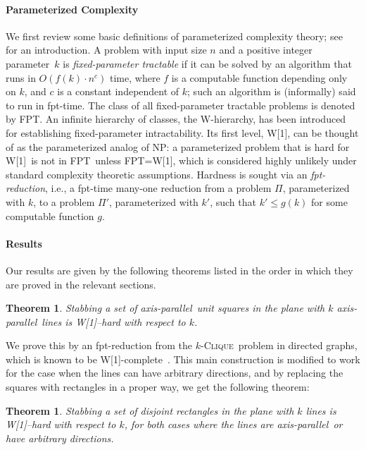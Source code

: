 \documentclass[12pt]{article}
\newtheorem{theorem}[definition]{Theorem}
\newcommand{\cclass}[1]{{#1}}
\newcommand{\problem}[1]{\textsc{#1}}
\newcommand{\fpt}{\cclass{FPT}}
\newcommand{\wone}{\cclass{W[1]}}
\newcommand{\clique}{\problem{Clique}}
\newcommand{\ap}{a.p.\ }
\renewcommand{\ap}{axis-parallel\ }
\begin{document}
\paragraph{Parameterized Complexity}
We first review some basic definitions of parameterized complexity theory;
see~\cite{DF99,FG06} for an introduction.
A problem with input size $n$ and a positive integer parameter~$k$ is
\emph{fixed-parameter tractable} if it can be solved by an algorithm that
runs in $O(f(k)\cdot n^{c})$ time, where $f$ is a computable function
depending only on $k$, and $c$ is a constant independent of $k$; such an
algorithm is (informally) said to run in fpt-time.  The class of all
fixed-parameter tractable problems is denoted by \fpt. An infinite
hierarchy of classes, the W-hierarchy, has been introduced for establishing
fixed-parameter intractability.  Its first level, \wone, can be thought of
as the parameterized analog of NP: a parameterized problem that is hard for
\wone\ is not in \fpt\ unless \fpt=\wone, which is considered highly
unlikely under standard complexity theoretic assumptions.  Hardness is
sought via an \emph{fpt-reduction}, i.e., a fpt-time many-one reduction
from a problem $\Pi$, parameterized with $k$, to a problem $\Pi'$,
parameterized with $k'$, such that $k'\leq g(k)$ for some computable
function $g$.

\paragraph{Results}

Our results are given by the following theorems listed in the order in which they are proved in the relevant sections.

\begin{theorem}\label{thm:wonehardunitsquaresap} 
Stabbing a set of \ap unit squares in the plane with $k$ \ap lines is \wone--hard with respect to $k$.
\end{theorem}

We prove this by an fpt-reduction from the $k$-\clique\ problem in directed
graphs, which is known to be W[1]-complete~\cite{FG06}. 
This main construction is modified to work for the case when the lines can have arbitrary directions, and 
by replacing the squares with rectangles in a proper way, we get the following theorem:

\begin{theorem}\label{thm:woneharddisjointrectanglesap}  
Stabbing a set of disjoint rectangles in the plane with $k$ lines is \wone--hard with respect to $k$, 
for both cases where the lines are \ap or have arbitrary directions.
\end{theorem}
\end{document}
